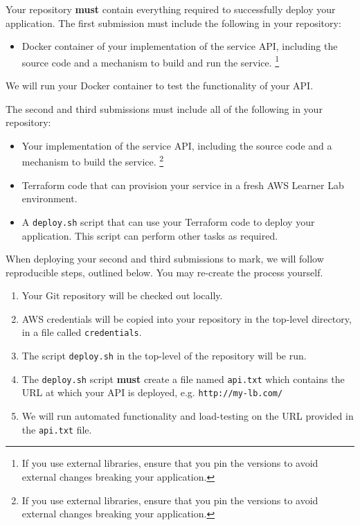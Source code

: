 \documentclass{csse4400}
\begin{document}
Your repository \textbf{must} contain everything required to successfully deploy your application.
The first submission must include the following in your repository:
\begin{itemize}
  \item Docker container of your implementation of the service API, including the source code and a mechanism to build and run the service.%
  \footnote{If you use external libraries, ensure that you pin the versions to avoid external changes breaking your application.}
\end{itemize}
We will run your Docker container to test the functionality of your API.

\begin{samepage}
\noindent
The second and third submissions must include all of the following in your repository:
\begin{itemize}
  \item Your implementation of the service API, including the source code and a mechanism to build the service.%
  \footnote{If you use external libraries, ensure that you pin the versions to avoid external changes breaking your application.}
  \item Terraform code that can provision your service in a fresh AWS Learner Lab environment.
  \item A \texttt{deploy.sh} script that can use your Terraform code to deploy your application.
    This script can perform other tasks as required.
\end{itemize}
\end{samepage}

\noindent
When deploying your second and third submissions to mark, we will follow reproducible steps, outlined below.
You may re-create the process yourself.

\begin{enumerate}
  \item Your Git repository will be checked out locally.
  \item AWS credentials will be copied into your repository in the top-level directory,
  in a file called \texttt{credentials}.
  \item The script \texttt{deploy.sh} in the top-level of the repository will be run.
  \item The \texttt{deploy.sh} script \textbf{must} create a file named \texttt{api.txt} which contains the URL at which your API is deployed, e.g. \texttt{http://my-lb.com/}
  \item We will run automated functionality and load-testing on the URL provided in the \texttt{api.txt} file.
\end{enumerate}
\end{document}
